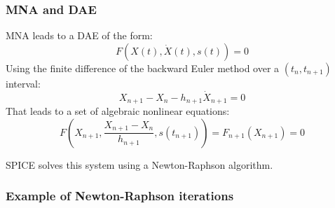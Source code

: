 
\frame
{
\frametitle{MNA and DAE}
 \begin{block}{MNA leads to a DAE of the form:}
\[F(X(t),\dot X(t),s(t))=0\]
Using the finite difference of the backward Euler method over a $(t_{n},t_{n+1})$ interval:
\[X_{n+1}-X_{n}-h_{n+1} \dot X_{n+1}=0\]
That leads to a set of algebraic nonlinear equations:
\[F(X_{n+1}, \frac{X_{n+1}-X_n}{h_{n+1}},s(t_{n+1}))=F_{n+1}(X_{n+1})=0\]


SPICE solves this system using a Newton-Raphson algorithm.
  \end{block}

}

\frame
{
\frametitle{Example of Newton-Raphson iterations}

  \begin{figure}
   \centerline{
   \scalebox{0.9}{
    
    }
 } 
 \end{figure}


}
